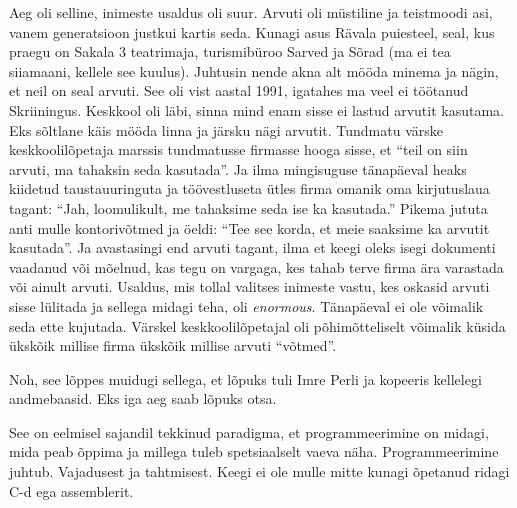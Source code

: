 
Aeg oli selline, inimeste usaldus oli suur. Arvuti oli müstiline ja teistmoodi 
asi, vanem 
generatsioon justkui kartis seda. Kunagi asus Rävala puiesteel, seal, kus 
praegu on Sakala 3 teatrimaja, turismibüroo Sarved ja Sõrad (ma ei tea siiamaani, kellele see kuulus). Juhtusin nende akna alt mööda 
minema ja nägin, et neil on 
seal arvuti. See oli vist aastal 1991, igatahes ma veel ei töötanud 
Skriiningus. Keskkool 
oli läbi, sinna mind enam sisse ei lastud arvutit kasutama. Eks sõltlane käis 
mööda linna ja järsku nägi arvutit. Tundmatu värske keskkoolilõpetaja 
marssis tundmatusse firmasse hooga sisse, et 
\enquote{teil on siin arvuti, ma tahaksin seda kasutada}. Ja ilma mingisuguse 
tänapäeval heaks kiidetud taustauuringuta ja töövestluseta ütles firma omanik 
oma kirjutuslaua tagant: \enquote{Jah, loomulikult, me tahaksime seda ise ka 
kasutada.}  Pikema jututa anti mulle kontorivõtmed ja öeldi: \enquote{Tee 
see korda, et meie saaksime ka arvutit kasutada}. Ja avastasingi end
arvuti tagant, ilma et keegi oleks isegi dokumenti vaadanud või mõelnud, kas 
tegu on
vargaga, kes tahab terve firma ära varastada või 
ainult arvuti. Usaldus, mis tollal valitses inimeste vastu, kes 
oskasid arvuti sisse lülitada ja sellega midagi teha, oli 
\emph{enormous}.\label{sisu:andrus_usaldus} 
Tänapäeval ei ole võimalik seda ette kujutada. Värskel keskkoolilõpetajal oli 
põhimõtteliselt võimalik küsida ükskõik millise firma ükskõik millise  
arvuti \enquote{võtmed}. 

Noh, see lõppes muidugi sellega, et lõpuks tuli Imre Perli ja kopeeris kellelegi andmebaasid. Eks iga 
aeg saab lõpuks otsa. 


See on eelmisel sajandil tekkinud paradigma, et 
programmeerimine on midagi, mida peab õppima ja millega tuleb 
spetsiaalselt vaeva näha. Programmeerimine juhtub. Vajadusest ja tahtmisest. 
Keegi ei ole mulle mitte kunagi õpetanud 
ridagi C-d ega assemblerit. 

